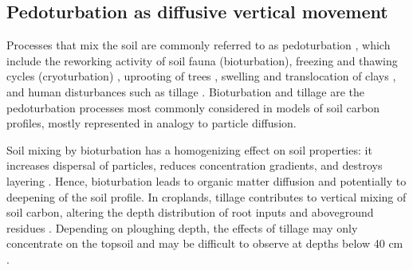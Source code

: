 \documentclass[11pt, oneside, a4paper]{article}   	%
\begin{document}
\subsection{Pedoturbation as diffusive vertical movement}
Processes that mix the soil are commonly referred to as pedoturbation \citep{Hole1961, Martin2017}, which include the reworking activity of soil fauna (bioturbation), freezing and thawing cycles (cryoturbation) \citep{Johnson1987, Bockheim2007, Beer2022},  uprooting of trees \citep{Schaetzl1990}, swelling and translocation of clays \citep{Finke2012}, and human disturbances such as tillage \citep{Martin2017, Keyvanshokouhi2019}. Bioturbation and tillage are the pedoturbation processes most commonly considered in models of soil carbon profiles, mostly represented in analogy to particle diffusion. 


Soil mixing by bioturbation has a homogenizing effect on soil properties: it increases
dispersal of particles, reduces concentration gradients, and destroys layering \citep{Johnson1987}. Hence, bioturbation leads to organic matter diffusion and potentially to deepening of the soil profile. 
In croplands, tillage contributes to vertical mixing of soil carbon, altering the depth distribution of root inputs and aboveground residues \citep{Luo2010}. Depending on ploughing depth, the effects of tillage may only concentrate on the topsoil and may be difficult to observe at depths below 40 cm \citep{Luo2010,Keyvanshokouhi2019, Mary2020}. 
\end{document}
